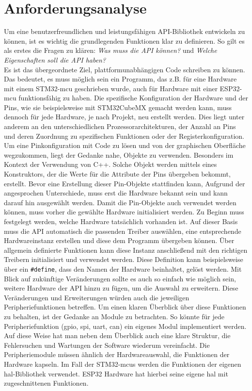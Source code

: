 \section{Anforderungsanalyse}
Um eine benutzerfreundlichen und leistungsfähigen API-Bibliothek entwickeln zu können, ist es wichtig die grundlegenden Funktionen klar zu definieren.
So gilt es als erstes die Fragen zu klären: \emph{Was muss die API können?} und \emph{Welche Eigenschaften soll die API haben?}\\
Es ist das übergeordnete Ziel, plattformunabhängigen Code schreiben zu können.
Das bedeutet, es muss möglich sein ein Programm, das z.B. für eine Hardware mit einem STM32-\gls{mcu} geschrieben wurde, auch für Hardware mit einer ESP32-\gls{mcu} funktionsfähig zu haben.
Die spezifische Konfiguration der Hardware und der Pins, wie sie beispielsweise mit STM32CubeMX gemacht werden kann, muss dennoch für jede Hardware, je nach Projekt, neu erstellt werden.
Dies liegt unter anderem an den unterschiedlichen Prozessorarchitekturen, der Anzahl an Pins und deren Zuordnung zu spezifischen Funktionen oder der Registerkonfiguration.
Um eine Pinkonfiguration mit Code zu lösen und von der graphischen Oberfläche wegzukommen, liegt der Gedanke nahe, Objekte zu verwenden.
Besonders im Kontext der Verwendung von C++.
Solche Objekt werden mittels eines Konstruktors, der die Werte für die Attribute der Pins übergeben bekommt, erstellt.
Bevor eine Erstellung dieser Pin-Objekte stattfinden kann, Aufgrund der angesprochen Unterschiede, muss erst die Hardware bekannt sein und kann darauf hin ausgewählt werden.
Damit die Pin-Objekte auch verwendet werden können, muss vorher die gewählte Hardware initialisiert werden.
Zu Beginn muss festgelegt werden, welche Hardware tatsächlich vorhanden ist. 
Auf dieser Basis muss die API automatisch die passenden Treiber auswählen, eine entsprechende Hardwareinstanz erstellen und diese dem Programm übergeben können. 
Über allgemein definierte Funktionen kann diese Instanz anschließend mit den richtigen Treibern initialisiert und verwendet werden.
Diese Definition kann beispielsweise über ein \texttt{\#define}, dass den Namen der Hardware beinhaltet, gelöst werden.
Mit Blick auf zukünftige Veränderungen sollte es auch so einfach wie möglich sein, weitere Hardware der API hinzu zu fügen, um die Auswahl zu erweitern.
Diese Veränderungen und Erweiterungen würden auch die jeweiligen Peripheriefunktionen betreffen.
Um einen klaren Überblick über diese Funktionen zu behalten, ist der Gedanke an Module zu betrachten.
So könnte für jede Peripheriefunktion (\gls{gpio}, \gls{spi}, \gls{uart}, \gls{can}) ein eigenes Modul implementiert werden.
Auf diese Weise hat man neben dem Überblick auch eine klare Struktur, die Fehlersuchen und Wartungen der Software wiederum vereinfacht.
Die Peripheriemodule müssen ähnlich der Hardwareauswahl, die Funktionen der Hardware kapseln.
Im Fall der STM32-\gls{mcu}s werden die Funktionen der eigenen \gls{hal}-Bibliothek verwendet.
ESP32 Hardware hat hierbei seine eigene \gls{hal} mit zugeschnittenen Funktionen.

